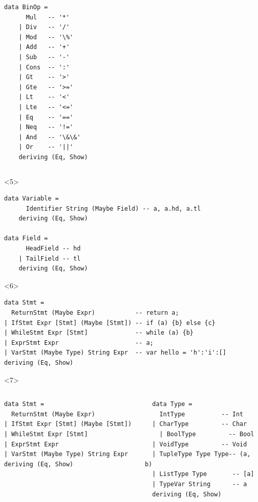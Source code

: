 \documentclass{beamer}
\begin{document}
\begin{frame}[fragile]
\begin{onlyenv}
\begin{columns}
  \begin{verbatim}
data BinOp =
      Mul   -- '*'
    | Div   -- '/'
    | Mod   -- '\%'
    | Add   -- '+'
    | Sub   -- '-' 
    | Cons  -- ':'
    | Gt    -- '>'
    | Gte   -- '>='
    | Lt    -- '<'
    | Lte   -- '<='
    | Eq    -- '=='
    | Neq   -- '!='
    | And   -- '\&\&'
    | Or    -- '||'
    deriving (Eq, Show)
  \end{verbatim}
\end{columns}
\end{onlyenv}

\begin{onlyenv}<5>
  \begin{verbatim}
data Variable = 
      Identifier String (Maybe Field) -- a, a.hd, a.tl
    deriving (Eq, Show)

data Field =
      HeadField -- hd
    | TailField -- tl
    deriving (Eq, Show)
  \end{verbatim}
\end{onlyenv}

\begin{onlyenv}<6>
  \begin{verbatim}
data Stmt =
  ReturnStmt (Maybe Expr)           -- return a;
| IfStmt Expr [Stmt] (Maybe [Stmt]) -- if (a) {b} else {c}
| WhileStmt Expr [Stmt]             -- while (a) {b}
| ExprStmt Expr                     -- a;
| VarStmt (Maybe Type) String Expr  -- var hello = 'h':'i':[]
deriving (Eq, Show)
  \end{verbatim}
\end{onlyenv}

\begin{onlyenv}<7>

\begin{columns}
  \begin{verbatim}
data Stmt =
  ReturnStmt (Maybe Expr)           
| IfStmt Expr [Stmt] (Maybe [Stmt]) 
| WhileStmt Expr [Stmt]            
| ExprStmt Expr                   
| VarStmt (Maybe Type) String Expr
deriving (Eq, Show)
\end{verbatim}

  \begin{verbatim}
  data Type =
    IntType          -- Int
  | CharType         -- Char
    | BoolType         -- Bool
  | VoidType         -- Void
  | TupleType Type Type-- (a, b)
  | ListType Type       -- [a]
  | TypeVar String      -- a
  deriving (Eq, Show)
  \end{verbatim}
\end{columns}
\end{onlyenv}


\end{frame}
\end{document}
